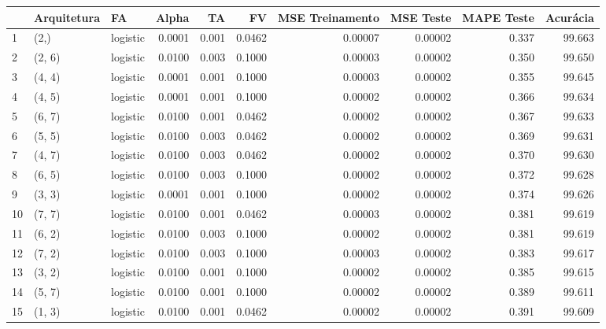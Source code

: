 \begin{tabular}{lllrrrrrrr}
\toprule
{} & Arquitetura &        FA &   Alpha &     TA &      FV &  MSE Treinamento &  MSE Teste &  MAPE Teste &  Acurácia \\
\midrule
1   &        (2,) &  logistic &  0.0001 &  0.001 &  0.0462 &          0.00007 &    0.00002 &       0.337 &    99.663 \\
2   &      (2, 6) &  logistic &  0.0100 &  0.003 &  0.1000 &          0.00003 &    0.00002 &       0.350 &    99.650 \\
3   &      (4, 4) &  logistic &  0.0001 &  0.001 &  0.1000 &          0.00003 &    0.00002 &       0.355 &    99.645 \\
4   &      (4, 5) &  logistic &  0.0001 &  0.001 &  0.1000 &          0.00002 &    0.00002 &       0.366 &    99.634 \\
5   &      (6, 7) &  logistic &  0.0100 &  0.001 &  0.0462 &          0.00002 &    0.00002 &       0.367 &    99.633 \\
6   &      (5, 5) &  logistic &  0.0100 &  0.003 &  0.0462 &          0.00002 &    0.00002 &       0.369 &    99.631 \\
7   &      (4, 7) &  logistic &  0.0100 &  0.003 &  0.0462 &          0.00002 &    0.00002 &       0.370 &    99.630 \\
8   &      (6, 5) &  logistic &  0.0100 &  0.003 &  0.1000 &          0.00002 &    0.00002 &       0.372 &    99.628 \\
9   &      (3, 3) &  logistic &  0.0001 &  0.001 &  0.1000 &          0.00002 &    0.00002 &       0.374 &    99.626 \\
10  &      (7, 7) &  logistic &  0.0100 &  0.001 &  0.0462 &          0.00003 &    0.00002 &       0.381 &    99.619 \\
11  &      (6, 2) &  logistic &  0.0100 &  0.003 &  0.1000 &          0.00002 &    0.00002 &       0.381 &    99.619 \\
12  &      (7, 2) &  logistic &  0.0100 &  0.003 &  0.1000 &          0.00003 &    0.00002 &       0.383 &    99.617 \\
13  &      (3, 2) &  logistic &  0.0100 &  0.001 &  0.1000 &          0.00002 &    0.00002 &       0.385 &    99.615 \\
14  &      (5, 7) &  logistic &  0.0100 &  0.001 &  0.1000 &          0.00002 &    0.00002 &       0.389 &    99.611 \\
15  &      (1, 3) &  logistic &  0.0100 &  0.001 &  0.0462 &          0.00002 &    0.00002 &       0.391 &    99.609 \\

\end{tabular}
